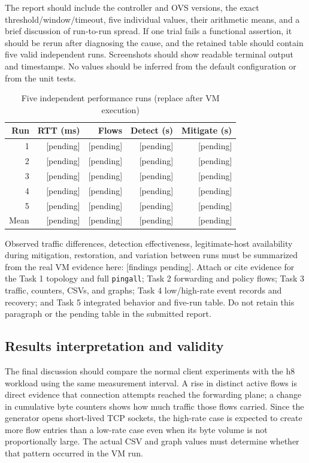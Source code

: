 \documentclass[conference]{IEEEtran}
\begin{document}
The report should include the controller and OVS versions, the exact threshold/window/timeout, five individual values, their arithmetic means, and a brief discussion of run-to-run spread. If one trial fails a functional assertion, it should be rerun after diagnosing the cause, and the retained table should contain five valid independent runs. Screenshots should show readable terminal output and timestamps. No values should be inferred from the default configuration or from the unit tests.

\begin{table}[t]
\caption{Five independent performance runs (replace after VM execution)}
\label{tab:results}
\centering\scriptsize
\begin{tabular}{rrrrr}
\toprule
Run & RTT (ms) & Flows & Detect (s) & Mitigate (s) \\
\midrule
1 & [pending] & [pending] & [pending] & [pending] \\
2 & [pending] & [pending] & [pending] & [pending] \\
3 & [pending] & [pending] & [pending] & [pending] \\
4 & [pending] & [pending] & [pending] & [pending] \\
5 & [pending] & [pending] & [pending] & [pending] \\
Mean & [pending] & [pending] & [pending] & [pending] \\
\bottomrule
\end{tabular}
\end{table}

Observed traffic differences, detection effectiveness, legitimate-host availability during mitigation, restoration, and variation between runs must be summarized from the real VM evidence here: [findings pending]. Attach or cite evidence for the Task 1 topology and full \texttt{pingall}; Task 2 forwarding and policy flows; Task 3 traffic, counters, CSVs, and graphs; Task 4 low/high-rate event records and recovery; and Task 5 integrated behavior and five-run table. Do not retain this paragraph or the pending table in the submitted report.

\subsection{Results interpretation and validity}
The final discussion should compare the normal client experiments with the h8 workload using the same measurement interval. A rise in distinct active flows is direct evidence that connection attempts reached the forwarding plane; a change in cumulative byte counters shows how much traffic those flows carried. Since the generator opens short-lived TCP sockets, the high-rate case is expected to create more flow entries than a low-rate case even when its byte volume is not proportionally large. The actual CSV and graph values must determine whether that pattern occurred in the VM run.
\end{document}
